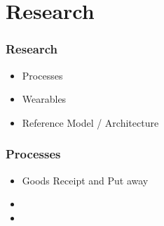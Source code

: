 \section{Research}
\begin{frame}\frametitle{Research}
	\begin{itemize}
		\item Processes
		\item Wearables
		\item Reference Model / Architecture
	\end{itemize}
\end{frame}

\begin{frame}\frametitle{Processes}
	\begin{itemize}
		\item Goods Receipt and Put away
		\item[]
		\item[]
	\end{itemize}
\end{frame}
